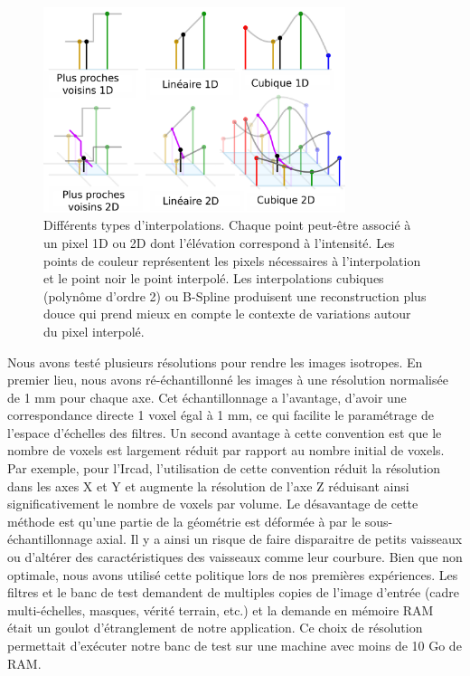 \begin{figure}[!ht]
  \centering
  \includegraphics[height=6cm]{Images/Interpolation.png}
  \caption{Différents types d'interpolations. Chaque point peut-être associé à un pixel 1D ou 2D dont l'élévation correspond à l'intensité. Les points de couleur représentent les pixels nécessaires à l'interpolation et le point noir le point interpolé. Les interpolations cubiques (polynôme d'ordre 2) ou B-Spline produisent une reconstruction plus douce qui prend mieux en compte le contexte de variations autour du pixel interpolé.\protect \footnotemark}
  \label{fig:interpolation}
\end{figure}


Nous avons testé plusieurs résolutions pour rendre les images isotropes. En premier lieu, nous avons ré-échantillonné les images à une résolution normalisée de 1 mm pour chaque axe. Cet échantillonnage a l'avantage, d'avoir une correspondance directe 1 voxel égal à 1 mm, ce qui facilite le paramétrage de l'espace d'échelles des filtres. Un second avantage à cette convention est que le nombre de voxels est largement réduit par rapport au nombre initial de voxels.
Par exemple, pour l'Ircad, l'utilisation de cette convention  réduit la résolution dans les axes X et Y et augmente la résolution de l'axe Z réduisant ainsi significativement le nombre de voxels par volume. Le désavantage de cette méthode est qu'une partie de la géométrie est déformée à par le sous-échantillonnage axial. Il y a ainsi un risque de faire disparaitre de petits vaisseaux ou d'altérer des caractéristiques des vaisseaux comme leur courbure.  Bien que non optimale, nous avons utilisé cette politique lors de nos premières expériences. Les filtres et le banc de test demandent de multiples copies de l'image d'entrée (cadre multi-échelles, masques, vérité terrain, etc.) et la demande en mémoire RAM était un goulot d'étranglement de notre application. Ce choix de résolution permettait d'exécuter notre banc de test sur une machine avec moins de 10 Go de RAM.

